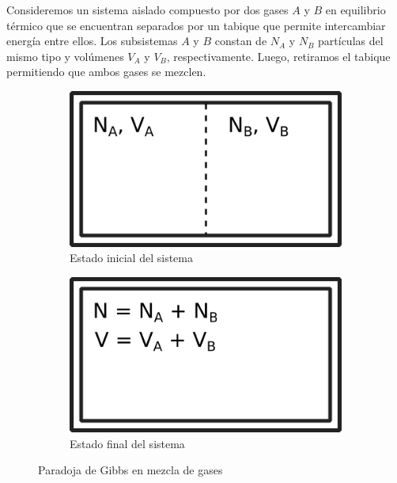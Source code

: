 \documentclass[a4paper,11pt]{article}
\begin{document}
Consideremos un sistema aislado compuesto por dos gases $A$ y $B$ en 
equilibrio térmico que se encuentran separados por un tabique que 
permite intercambiar energía entre ellos.
Los subsistemas $A$ y $B$ constan de $N_A$ y $N_B$ partículas del mismo 
tipo y volúmenes $V_A$ y $V_B$, respectivamente.
Luego, retiramos el tabique permitiendo que ambos gases se mezclen.

\begin{figure}[h!]
    \centering
    \begin{subfigure}[b]{0.3\textwidth}
        \includegraphics[width=\textwidth]{figs/paradoja-gibbs-1.png}
        \caption{Estado inicial del sistema}
        \label{fig:gibbs-tabique}
    \end{subfigure}
    \hspace{0.1\textwidth}
    \begin{subfigure}[b]{0.3\textwidth}
        \includegraphics[width=\textwidth]{figs/paradoja-gibbs-2.png}
        \caption{Estado final del sistema}
        \label{fig:gibbs-mezcla}
    \end{subfigure}
    \caption{Paradoja de Gibbs en mezcla de gases}
\end{figure}
\end{document}
